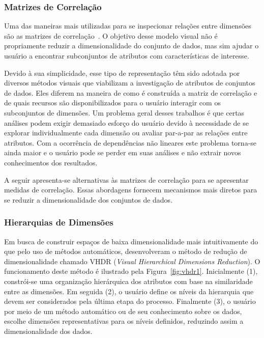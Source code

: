 \subsubsection{Matrizes de Correlação}\label{sss:cormat}

Uma das maneiras mais utilizadas para se inspecionar
relações entre dimensões são as matrizes de
correlação~\cite{Friendly2002}. O objetivo desse modelo
visual não é propriamente reduzir a dimensionalidade do
conjunto de dados, mas sim ajudar o usuário a encontrar
subconjuntos de atributos com características de interesse.

Devido à sua simplicidade, esse tipo de representação têm
sido adotada por diversos métodos visuais que viabilizam a
investigação de atributos de conjuntos de
dados\citet{Friendly2002,Guo2003,MacEachren2003,
RBF2004,May2011ss,Johansson2009,Ingram2010,May2011}. Eles
diferem na maneira de como é construída a matriz de
correlação e de quais recursos são disponibilizados para o
usuário interagir com os subconjuntos de dimensões. Um
problema geral desses trabalhos é que certas análises podem
exigir demasiado esforço do usuário devido à necessidade de
se explorar individualmente cada dimensão ou avaliar
par-a-par as relações entre atributos. Com a ocorrência de
dependências não lineares este problema torna-se ainda maior
e o usuário pode se perder em suas análises e não extrair
novos conhecimentos dos resultados. 

A seguir apresenta-se alternativas às matrizes de correlação
para se apresentar medidas de correlação. Essas abordagens
fornecem mecanismos mais diretos para se reduzir a
dimensionalidade dos conjuntos de dados. 

\subsubsection{Hierarquias de Dimensões}

Em busca de construir espaços de baixa dimensionalidade mais
intuitivamente do que pelo uso de métodos automáticos,
\citet{Yang2003} desenvolveram o método de redução de
dimensionalidade chamado VHDR (\emph{Visual Hierarchical
Dimensions Reduction}). O funcionamento deste método é
ilustrado pela Figura~\ref{fig:vhdr1}. Inicialmente (1),
constrói-se uma organização hierárquica dos atributos com
base na similaridade entre as dimensões. Em seguida (2), o
usuário define os níveis da hierarquia que devem ser
considerados pela última etapa do processo. Finalmente (3), o
usuário por meio de um método automático ou de seu
conhecimento sobre os dados, escolhe dimensões
representativas para os níveis definidos, reduzindo assim a
dimensionalidade dos dados. 

